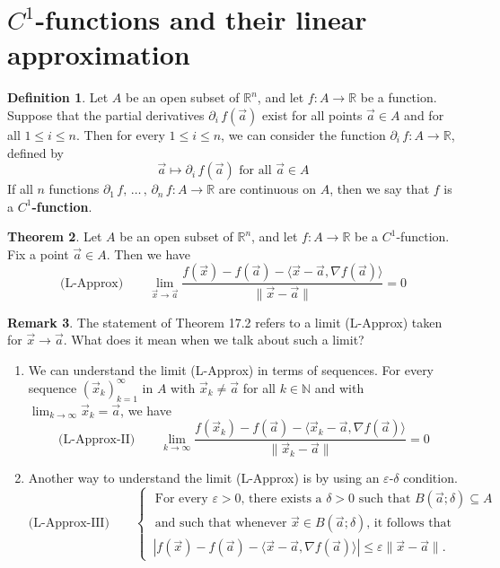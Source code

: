 \documentclass[11pt]{article}
\theoremstyle{definition}
\newtheorem{thm}{Theorem}[section]
\newtheorem{defn}[thm]{Definition}
\newtheorem{remark}[thm]{Remark}
\newcommand{\N}{\ensuremath{\mathbb{N}}}
\newcommand{\R}{\ensuremath{\mathbb{R}}}
\begin{document}
\newpage
{}
\section{$C^1$-functions and their linear approximation}

\begin{defn}
Let $A$ be an open subset of $\R^n$, and let $f : A \to \R$ be a function. Suppose that the partial derivatives $\partial_i\,f(\vec{a})$ exist for all points $\vec{a} \in A$ and for all $1 \leq i \leq n$. Then for every $1 \leq i \leq n$, we can consider the function $\partial_i\,f : A \to \R$, defined by
$$\vec{a} \mapsto \partial_i\,f(\vec{a}) \text{ for all } \vec{a} \in A$$
If all $n$ functions $\partial_1\,f,\, \dots\,,\, \partial_n\,f : A \to \R$ are continuous on $A$, then we say that $f$ is a {\bf $C^1$-function}.
\end{defn}

\begin{thm}
Let $A$ be an open subset of $\R^n$, and let $f : A \to \R$ be a $C^1$-function. Fix a point $\vec{a} \in A$. Then we have
$$\text{(L-Approx)} \qquad \lim_{\vec{x}\to\vec{a}} \frac{f(\vec{x}) - f(\vec{a}) - \langle \vec{x} - \vec{a}, \nabla f(\vec{a})\rangle}{\|\vec{x} - \vec{a}\|} =  0$$
\end{thm}

\begin{remark}
The statement of Theorem 17.2 refers to a limit (L-Approx) taken for $\vec{x} \to \vec{a}$. What does it mean when we talk about such a limit? 
\vspace{-1.5ex}\begin{enumerate}[(1)]
    \item We can understand the limit (L-Approx) in terms of sequences. For every sequence $(\vec{x}_k)_{k=1}^\infty$ in $A$ with $\vec{x}_k \neq \vec{a}$ for all $k \in \N$ and with $\lim_{k\to\infty} \vec{x}_k = \vec{a}$, we have
    $$\text{(L-Approx-II)} \qquad \lim_{k\to\infty} \frac{f(\vec{x}_k) - f(\vec{a}) - \langle \vec{x}_k - \vec{a}, \nabla f(\vec{a})\rangle}{\|\vec{x}_k - \vec{a}\|} = 0$$
    \item Another way to understand the limit (L-Approx) is by using an $\varepsilon$-$\delta$ condition. $$\text{(L-Approx-III)} \qquad \begin{cases} \text{ For every $\varepsilon > 0$, there exists a $\delta > 0$ such that $B(\vec{a}; \delta) \subseteq A$} \\ \text{ and such that whenever $\vec{x} \in B(\vec{a}; \delta)$, it follows that} \\ \, |f(\vec{x}) - f(\vec{a}) - \langle \vec{x} - \vec{a}, \nabla f(\vec{a}) \rangle| \leq \varepsilon \|\vec{x} - \vec{a}\|. \end{cases}$$
\end{enumerate}\vspace{-1.5ex}
\end{remark}
\end{document}
